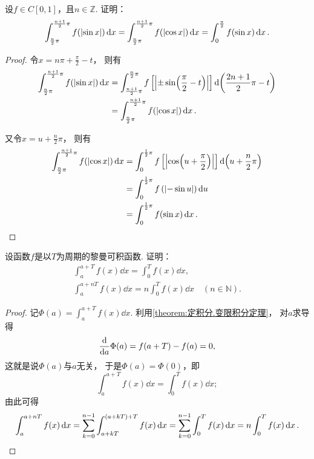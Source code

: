 \begin{proposition}
设\(f \in C[0,1]\)，且\(n\in\mathbb{Z}\).
证明：\begin{equation}
	\int_{\frac{n}{2} \pi}^{\frac{n+1}{2} \pi} f(\abs{\sin x}) \dd{x}
	= \int_{\frac{n}{2} \pi}^{\frac{n+1}{2} \pi} f(\abs{\cos x}) \dd{x}
	= \int_0^{\frac{\pi}{2}} f(\sin x) \dd{x}.
\end{equation}
\def\arraystretch{1.5}
\begin{proof}
令\(x = n\pi+\frac{\pi}{2}-t\)，
则有\begin{align*}
	\int_{\frac{n}{2} \pi}^{\frac{n+1}{2} \pi} f(\abs{\sin x}) \dd{x}
	&= \int_{\frac{n+1}{2} \pi}^{\frac{n}{2} \pi} f\left[\abs{\pm\sin(\frac{\pi}{2}-t)}\right] \dd(\frac{2n+1}{2}\pi-t) \\
	&= \int_{\frac{n}{2} \pi}^{\frac{n+1}{2} \pi} f(\abs{\cos x}) \dd{x}.
\end{align*}

又令\(x=u+\frac{n}{2} \pi\)，
则有\begin{align*}
	\int_{\frac{n}{2} \pi}^{\frac{n+1}{2} \pi} f(\abs{\cos x}) \dd{x}
	&= \int_0^{\frac{1}{2}\pi} f\left[ \abs{\cos(u+\frac{\pi}{2})} \right] \dd(u+\frac{n}{2}\pi) \\
	&= \int_0^{\frac{1}{2}\pi} f\left( \abs{-\sin u} \right) \dd{u} \\
	&= \int_0^{\frac{1}{2}\pi} f(\sin x) \dd{x}.
	\qedhere
\end{align*}
\end{proof}
\end{proposition}

\begin{proposition}\label{theorem:定积分.周期函数的积分}
设函数\(f\)是以\(T\)为周期的黎曼可积函数.
证明：\begin{gather}
	\int_a^{a+T} f(x) \dd{x} = \int_0^T f(x) \dd{x}, \\
	\int_a^{a+nT} f(x) \dd{x} = n\int_0^T f(x) \dd{x}
	\quad(n \in \mathbb{N}).
\end{gather}
\begin{proof}
记\(\Phi(a) = \int_a^{a+T} f(x) \dd{x}\).
利用\cref{theorem:定积分.变限积分定理}，
对\(a\)求导得\[
	\dv{a} \Phi(a) = f(a+T) - f(a) = 0,
\]
这就是说\(\Phi(a)\)与\(a\)无关，
于是\(\Phi(a) = \Phi(0)\)，即\[
	\int_a^{a+T} f(x) \dd{x} = \int_0^T f(x) \dd{x};
\]
由此可得\[
	\int_a^{a+nT} f(x) \dd{x}
	= \sum_{k=0}^{n-1} \int_{a+kT}^{(a+kT)+T} f(x) \dd{x}
	= \sum_{k=0}^{n-1} \int_0^T f(x) \dd{x}
	= n \int_0^T f(x) \dd{x}.
	\qedhere
\]
\end{proof}
\end{proposition}

